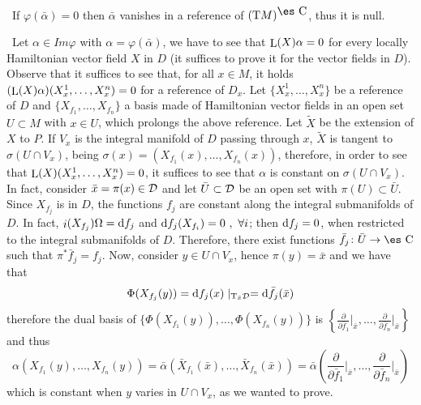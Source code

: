 \documentclass[12pt]{article}
\def\dst{\(}
\def\derpar#1#2{\frac{\partial{#1}}{\partial{#2}}}
\def\d{{\rm d}}
\def\Complex{\mbox{\es C}}
\def\inn{\mathop{i}\nolimits}
\def\Tan{{\rm T}}
\def\Lie{\mathop{\rm L}\nolimits}
\begin{document}
 \
If $\varphi (\bar \alpha )=0$ then $\bar \alpha$ vanishes
in a reference of $(\Tan M)^{\Complex}$, thus it is null.

 \
Let $\alpha \in Im \varphi$ with $\alpha = \varphi (\bar \alpha )$,
we have to see that $\Lie (X)\alpha = 0$
for every locally Hamiltonian vector field $X$ in $D$
(it suffices to prove it for the vector fields in $D$).
Observe that it suffices to see that, for all $x \in M$, it holds
$(\Lie(X)\alpha) (X_x^1, \ldots ,X_x^n)=0$ for a reference of $D_x$.
Let $\{X_x^1,\ldots ,X_x^n \}$ be a reference of $D$ and
$\{X_{f_1},\ldots ,X_{f_n} \}$
a basis made of Hamiltonian vector fields in an open set $U \subset M$
with $x \in U$,
which prolongs the above reference. Let $\tilde X$ be the extension of
$X$ to $P$.
If $V_x$ is the integral manifold of $D$
passing through $x$, $\tilde X$ is tangent to $\sigma (U\cap V_x)$,
being
$\sigma (x) = (X_{f_1}(x),\ldots ,X_{f_n}(x))$, therefore, in order to
see that
$\Lie(X)(X_x^1,\ldots ,X_x^n)=0$, it suffices to see that $\alpha$
is constant on $\sigma (U\cap V_x)$. In fact, consider
$\bar x = \pi (x) \in {\cal D}$ and let $\bar U \subset {\cal D}$ be an
open set
with $\pi (U) \subset \bar U$. Since $X_{f_j}$ is in $D$,
the functions $f_j$ are constant  along the integral submanifolds of
$D$.
In fact, $\inn(X_{f_j})\Omega = \d f_j$ and $\d f_j(X_{f_i})=0 \ , \
\forall i$;
then $\d f_j = 0$, when restricted to the integral submanifolds of $D$.
Therefore, there exist functions $\bar f_j \colon \bar U \to \Complex$
such that $\pi^* \bar f_j = f_j$. Now, consider $y \in U \cap V_x$,
hence $\pi (y) = \bar x$ and we have that
$$
\Phi (X_{f_j}(y)) = \d f_j(x)\mid_{\Tan_{\bar x}{\cal D}} =
\d \bar f_j(\bar x)
$$
therefore the dual basis of $\{ \Phi (X_{f_1}(y)), \ldots ,\Phi
(X_{f_n}(y)) \}$
is \dst\left\{ \derpar{}{\bar f_1}\Big\vert_{\bar x},\ldots
,\derpar{}{\bar f_n}\Big\vert_{\bar x}\right\} \)
and thus
$$
\alpha (X_{f_1}(y), \ldots ,X_{f_n}(y))=
\bar \alpha (\bar X_{f_1}(\bar x), \ldots ,\bar X_{f_n}(\bar x)) =
\bar \alpha \left(\derpar{}{\bar f_1}\Big\vert_{\bar x},\ldots ,
\derpar{}{\bar f_n}\Big\vert_{\bar x}\right)
$$
which is constant when $y$ varies in $U \cap V_x$, as we wanted to
prove.
\end{document}
